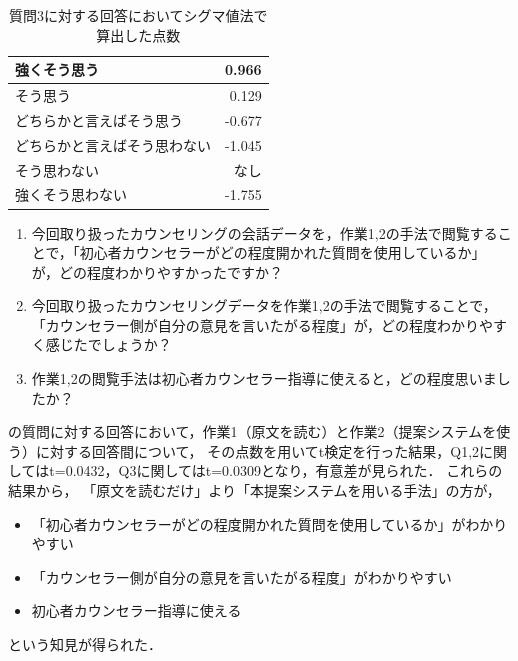 \documentclass[shuuron]{kuee}
\begin{document}
\begin{table}
  \caption{質問3に対する回答においてシグマ値法で算出した点数}
  \label{table:sigma2}
  \begin{center}
    \begin{tabular}{|l|r|} \hline
      強くそう思う & 0.966 \\ \hline
      そう思う  & 0.129 \\ \hline
      どちらかと言えばそう思う & -0.677 \\ \hline
      どちらかと言えばそう思わない & -1.045 \\ \hline
      そう思わない  & なし \\ \hline
      強くそう思わない & -1.755 \\ \hline
    \end{tabular}
  \end{center}
\end{table}


\begin{enumerate}

  \item 今回取り扱ったカウンセリングの会話データを，作業1,2の手法で閲覧することで，「初心者カウンセラーがどの程度開かれた質問を使用しているか」が，どの程度わかりやすかったですか？
  \item 今回取り扱ったカウンセリングデータを作業1,2の手法で閲覧することで，「カウンセラー側が自分の意見を言いたがる程度」が，どの程度わかりやすく感じたでしょうか？
  \item 作業1,2の閲覧手法は初心者カウンセラー指導に使えると，どの程度思いましたか？
\end{enumerate}
の質問に対する回答において，作業1（原文を読む）と作業2（提案システムを使う）に対する回答間について，
その点数を用いてt検定を行った結果，Q1,2に関してはt=0.0432，Q3に関してはt=0.0309となり，有意差が見られた．
これらの結果から，
「原文を読むだけ」より「本提案システムを用いる手法」の方が，
\begin{itemize}
  \item 「初心者カウンセラーがどの程度開かれた質問を使用しているか」がわかりやすい
  \item 「カウンセラー側が自分の意見を言いたがる程度」がわかりやすい
  \item 初心者カウンセラー指導に使える
\end{itemize}
という知見が得られた．


\end{document}
